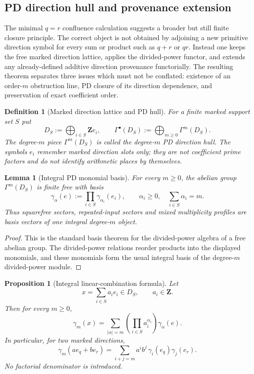 \documentclass[11pt]{article}
\newtheorem{proposition}[theorem]{Proposition}
\newtheorem{lemma}[theorem]{Lemma}
\newtheorem{definition}[theorem]{Definition}
\theoremstyle{remark}
\newcommand{\Z}{\mathbf Z}
\begin{document}
\subsection{PD direction hull and provenance extension}\label{P1C-sec:pd-direction-hull}

The minimal $q=r$ confluence calculation suggests a broader but still finite closure principle. The correct object is not obtained by adjoining a new primitive direction symbol for every sum or product such as $q+r$ or $qr$. Instead one keeps the free marked direction lattice, applies the divided-power functor, and extends any already-defined additive direction provenance functorially. The resulting theorem separates three issues which must not be conflated: existence of an order-$m$ obstruction line, PD closure of its direction dependence, and preservation of exact coefficient order.

\begin{definition}[Marked direction lattice and PD hull]\label{P1C-def:pd-direction-hull}
For a finite marked support set $S$ put
\[
D_S:=\bigoplus_{i\in S}\Z e_i,
\qquad
\Gamma^\bullet(D_S):=\bigoplus_{m\ge0}\Gamma^m(D_S).
\]
The degree-$m$ piece $\Gamma^m(D_S)$ is called the \emph{degree-$m$ PD direction hull}. The symbols $e_i$ remember marked direction slots only; they are not coefficient prime factors and do not identify arithmetic places by themselves.
\end{definition}

\begin{lemma}[Integral PD monomial basis]\label{P1C-thm:pd-monomial-basis}
For every $m\ge0$, the abelian group $\Gamma^m(D_S)$ is finite free with basis
\[
\boxed{
\gamma_\alpha(e):=\prod_{i\in S}\gamma_{\alpha_i}(e_i),
\qquad
\alpha_i\ge0,
\quad
\sum_{i\in S}\alpha_i=m.}
\]
Thus squarefree sectors, repeated-input sectors and mixed multiplicity profiles are basis vectors of one integral degree-$m$ object.
\end{lemma}

\begin{proof}
This is the standard basis theorem for the divided-power algebra of a free abelian group. The divided-power relations reorder products into the displayed monomials, and these monomials form the usual integral basis of the degree-$m$ divided-power module.
\end{proof}

\begin{proposition}[Integral linear-combination formula]\label{P1C-thm:pd-integral-linear-combination}
Let
\[
x=\sum_{i\in S}a_i e_i\in D_S,
\qquad a_i\in\Z.
\]
Then for every $m\ge0$,
\[
\boxed{
\gamma_m(x)=\sum_{|\alpha|=m}\left(\prod_{i\in S}a_i^{\alpha_i}\right)\gamma_\alpha(e).}
\]
In particular, for two marked directions,
\[
\boxed{
\gamma_m(ae_q+be_r)=\sum_{i+j=m}a^i b^j\,\gamma_i(e_q)\gamma_j(e_r).}
\]
No factorial denominator is introduced.
\end{proposition}
\end{document}
